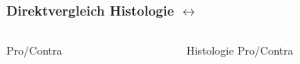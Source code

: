 \begin{frame}
	\frametitle{Direktvergleich Histologie \(\leftrightarrow\) \uct}
		\begin{columns}
			\begin{column}{0.49\linewidth}
				\uct Pro/Contra
 			\end{column}
 			\begin{column}{0.49\linewidth}
 				Histologie Pro/Contra
 			\end{column}
 		\end{columns}
\end{frame}


